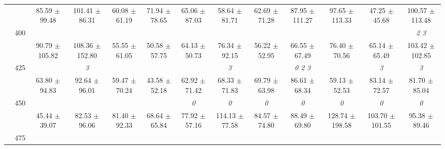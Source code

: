 \begin{table}[h]
{\begin{tabular}{
        ccccccccccccc}
 & & \cellcolor[HTML]{EFEFEF} 85.59 $\pm$ 99.48& \cellcolor[HTML]{EFEFEF} 101.41 $\pm$ 86.31& \cellcolor[HTML]{EFEFEF} 60.08 $\pm$ 61.19& \cellcolor[HTML]{EFEFEF} 71.94 $\pm$ 78.65& \cellcolor[HTML]{EFEFEF} 65.06 $\pm$ 87.03& \cellcolor[HTML]{EFEFEF} 58.64 $\pm$ 81.71& \cellcolor[HTML]{EFEFEF} 62.69 $\pm$ 71.28& \cellcolor[HTML]{EFEFEF} 87.95 $\pm$ 111.27& \cellcolor[HTML]{EFEFEF} 97.65 $\pm$ 113.33& \cellcolor[HTML]{EFEFEF} 47.25 $\pm$ 45.68& \cellcolor[HTML]{EFEFEF} 100.57 $\pm$ 113.48 \\ 
 & \multirow{2}{*}{400}& & & & & & & & & & & \textit{ 2 3 } \\ 
 & & 90.79 $\pm$ 105.82& 108.36 $\pm$ 152.80& 55.55 $\pm$ 61.05& 50.58 $\pm$ 57.75& 64.13 $\pm$ 50.73& 76.34 $\pm$ 92.15& 56.22 $\pm$ 52.95& 66.55 $\pm$ 67.49& 76.40 $\pm$ 70.56& 65.14 $\pm$ 65.49& 103.42 $\pm$ 102.85 \\ 
 & \multirow{2}{*}{425}& \cellcolor[HTML]{EFEFEF} & \cellcolor[HTML]{EFEFEF} \textit{ 3 }& \cellcolor[HTML]{EFEFEF} & \cellcolor[HTML]{EFEFEF} & \cellcolor[HTML]{EFEFEF} & \cellcolor[HTML]{EFEFEF} \textit{ 3 }& \cellcolor[HTML]{EFEFEF} & \cellcolor[HTML]{EFEFEF} \textit{ 0 2 3 }& \cellcolor[HTML]{EFEFEF} & \cellcolor[HTML]{EFEFEF} \textit{ 3 }& \cellcolor[HTML]{EFEFEF} \textit{ 3 } \\ 
 & & \cellcolor[HTML]{EFEFEF} 63.80 $\pm$ 94.83& \cellcolor[HTML]{EFEFEF} 92.64 $\pm$ 96.01& \cellcolor[HTML]{EFEFEF} 59.47 $\pm$ 70.24& \cellcolor[HTML]{EFEFEF} 43.58 $\pm$ 52.18& \cellcolor[HTML]{EFEFEF} 62.92 $\pm$ 71.42& \cellcolor[HTML]{EFEFEF} 68.33 $\pm$ 71.83& \cellcolor[HTML]{EFEFEF} 69.79 $\pm$ 63.98& \cellcolor[HTML]{EFEFEF} 86.61 $\pm$ 68.34& \cellcolor[HTML]{EFEFEF} 59.13 $\pm$ 52.53& \cellcolor[HTML]{EFEFEF} 83.14 $\pm$ 72.57& \cellcolor[HTML]{EFEFEF} 81.70 $\pm$ 85.04 \\ 
 & \multirow{2}{*}{450}& & & & & \textit{ 0 }& \textit{ 0 }& \textit{ 0 }& \textit{ 0 }& \textit{ 0 }& \textit{ 0 }& \textit{ 0 } \\ 
 & & 45.44 $\pm$ 39.07& 82.53 $\pm$ 96.06& 81.40 $\pm$ 92.33& 68.64 $\pm$ 65.84& 77.92 $\pm$ 57.16& 114.13 $\pm$ 77.58& 84.57 $\pm$ 74.80& 88.49 $\pm$ 69.80& 128.74 $\pm$ 198.58& 103.70 $\pm$ 101.55& 95.38 $\pm$ 89.46 \\ 
 & \multirow{2}{*}{475}& \cellcolor[HTML]{EFEFEF} & \cellcolor[HTML]{EFEFEF} & \cellcolor[HTML]{EFEFEF} & \cellcolor[HTML]{EFEFEF} & \cellcolor[HTML]{EFEFEF} & \cellcolor[HTML]{EFEFEF} & \cellcolor[HTML]{EFEFEF} & \cellcolor[HTML]{EFEFEF} & \cellcolor[HTML]{EFEFEF} & \cellcolor[HTML]{EFEFEF} & \cellcolor[HTML]{EFEFEF}  \\ 

\end{tabular}}
\end{table}
